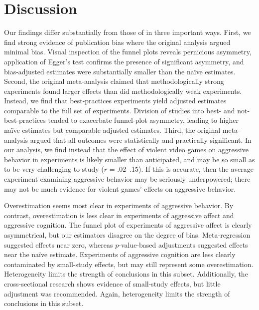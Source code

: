 \documentclass[man, mask]{apa6}
\begin{document}
\section{Discussion}
Our findings differ substantially from those of \citet{Anderson:etal:2010} in three important ways. First, we find strong evidence of publication bias where the original analysis argued minimal bias. Visual inspection of the funnel plots reveals pernicious asymmetry, application of Egger's test confirms the presence of significant asymmetry, and bias-adjusted estimates were substantially smaller than the na{\"i}ve estimates. Second, the original meta-analysis claimed that methodologically strong experiments found larger effects than did methodologically weak experiments. Instead, we find that best-practices experiments yield adjusted estimates comparable to the full set of experiments. Division of studies into best- and not-best-practices tended to exacerbate funnel-plot asymmetry, leading to higher na{\"i}ve estimates but comparable adjusted estimates.  
Third, the original meta-analysis argued that all outcomes were statistically and practically significant. In our analysis, we find instead that the effect of violent video games on aggressive behavior in experiments is likely smaller than anticipated, and may be so small as to be very challenging to study ($r$ = .02--.15). If this is accurate, then the average experiment examining aggressive behavior may be seriously underpowered; there may not be much evidence for violent games' effects on aggressive behavior. 

Overestimation seems most clear in experiments of aggressive behavior. By contrast, overestimation is less clear in experiments of aggressive affect and aggressive cognition. The funnel plot of experiments of aggressive affect is clearly asymmetrical, but our estimators disagree on the degree of bias. Meta-regression suggested effects near zero, whereas $p$-value-based adjustments suggested effects near the na{\"i}ve estimate. Experiments of aggressive cognition are less clearly contaminated by small-study effects, but may still represent some overestimation. Heterogeneity limits the strength of conclusions in this subset. Additionally, the cross-sectional research shows evidence of small-study effects, but little adjustment was recommended. Again, heterogeneity limits the strength of conclusions in this subset.
 
\end{document}
